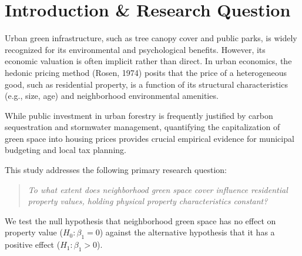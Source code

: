 \section{Introduction \& Research Question}
Urban green infrastructure, such as tree canopy cover and public parks, is widely recognized for its environmental and psychological benefits. However, its economic valuation is often implicit rather than direct. In urban economics, the hedonic pricing method (Rosen, 1974) posits that the price of a heterogeneous good, such as residential property, is a function of its structural characteristics (e.g., size, age) and neighborhood environmental amenities. 

While public investment in urban forestry is frequently justified by carbon sequestration and stormwater management, quantifying the capitalization of green space into housing prices provides crucial empirical evidence for municipal budgeting and local tax planning. 

This study addresses the following primary research question:
\begin{quote}
\textit{To what extent does neighborhood green space cover influence residential property values, holding physical property characteristics constant?}
\end{quote}

We test the null hypothesis that neighborhood green space has no effect on property value ($H_0: \beta_1 = 0$) against the alternative hypothesis that it has a positive effect ($H_1: \beta_1 > 0$).
